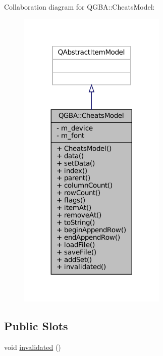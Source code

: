 Collaboration diagram for Q\+G\+BA\+:\+:Cheats\+Model\+:
\nopagebreak
\begin{figure}[H]
\begin{center}
\leavevmode
\includegraphics[width=200pt]{class_q_g_b_a_1_1_cheats_model__coll__graph}
\end{center}
\end{figure}
\subsection*{Public Slots}
\begin{DoxyCompactItemize}
\item 
void \mbox{\hyperlink{class_q_g_b_a_1_1_cheats_model_a5c3aad6f6819464b8f55510cb4ae69df}{invalidated}} ()
\end{DoxyCompactItemize}
